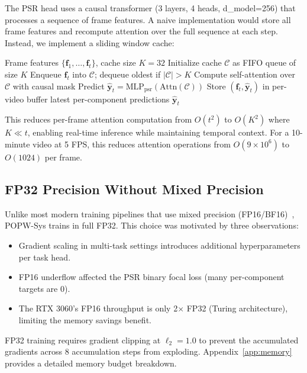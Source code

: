 \documentclass[10pt,twocolumn]{article}
\newcommand{\popwsys}{POPW-Sys}
\begin{document}
The PSR head uses a causal transformer (3 layers, 4 heads, d\_model=256) that processes a sequence of frame features. A naive implementation would store all frame features and recompute attention over the full sequence at each step. Instead, we implement a sliding window cache:

\begin{algorithm}[htbp]
\caption{PSR Causal Transformer with Sliding Cache}
\label{alg:psr-cache}
\begin{algorithmic}[1]
\Require Frame features $\{\mathbf{f}_1, \ldots, \mathbf{f}_t\}$, cache size $K=32$
\State Initialize cache $\mathcal{C}$ as FIFO queue of size $K$
    \State Enqueue $\mathbf{f}_t$ into $\mathcal{C}$; dequeue oldest if $|\mathcal{C}| > K$
    \State Compute self-attention over $\mathcal{C}$ with causal mask
    \State Predict $\hat{\mathbf{y}}_t = \text{MLP}_{\text{psr}}(\text{Attn}(\mathcal{C}))$
    \State Store $(\mathbf{f}_t, \hat{\mathbf{y}}_t)$ in per-video buffer
\EndFor
\State \Return latest per-component predictions $\hat{\mathbf{y}}_t$
\end{algorithmic}
\end{algorithm}

This reduces per-frame attention computation from $O(t^2)$ to $O(K^2)$ where $K \ll t$, enabling real-time inference while maintaining temporal context. For a 10-minute video at 5 FPS, this reduces attention operations from $O(9 \times 10^6)$ to $O(1024)$ per frame.

\subsection{FP32 Precision Without Mixed Precision}

Unlike most modern training pipelines that use mixed precision (FP16/BF16)~\cite{micikevicius2018mixed}, \popwsys{} trains in full FP32. This choice was motivated by three observations:
\begin{itemize}[nosep]
\item Gradient scaling in multi-task settings introduces additional hyperparameters per task head.
\item FP16 underflow affected the PSR binary focal loss (many per-component targets are 0).
\item The RTX 3060's FP16 throughput is only 2$\times$ FP32 (Turing architecture), limiting the memory savings benefit.
\end{itemize}

FP32 training requires gradient clipping at $\ell_2 = 1.0$ to prevent the accumulated gradients across 8 accumulation steps from exploding. Appendix~\ref{app:memory} provides a detailed memory budget breakdown.
\end{document}
